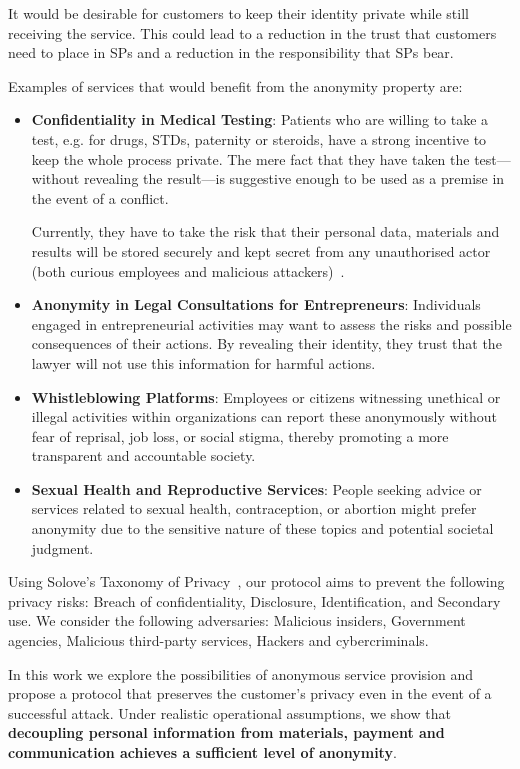 \documentclass[pdftex,twocolumn,epjc3]{svjour3}
\begin{document}
It would be desirable for customers to keep their identity private while still receiving the service. This could lead to a reduction in the trust that customers need to place in SPs and a reduction in the responsibility that SPs bear.

Examples of services that would benefit from the anonymity property are:
\begin{itemize}
    \item \textbf{Confidentiality in Medical Testing}: Patients who are willing to take a test, e.g. for drugs, STDs, paternity or steroids, have a strong incentive to keep the whole process private. The mere fact that they have taken the test—without revealing the result—is suggestive enough to be used as a premise in the event of a conflict.

    Currently, they have to take the risk that their personal data, materials and results will be stored securely and kept secret from any unauthorised actor (both curious employees and malicious attackers)~\cite{klitzmanExclusionGeneticInformation2010, blackPresymptomaticTestingConfidentiality2021}.


\item \textbf{Anonymity in Legal Consultations for Entrepreneurs}: Individuals engaged in entrepreneurial activities may want to assess the risks and possible consequences of their actions. By revealing their identity, they trust that the lawyer will not use this information for harmful actions.
\item \textbf{Whistleblowing Platforms}: Employees or citizens witnessing unethical or illegal activities within organizations can report these anonymously without fear of reprisal, job loss, or social stigma, thereby promoting a more transparent and accountable society.
\item \textbf{Sexual Health and Reproductive Services}: People seeking advice or services related to sexual health, contraception, or abortion might prefer anonymity due to the sensitive nature of these topics and potential societal judgment.
\end{itemize}

Using Solove's Taxonomy of Privacy~\cite{soloveTaxonomyPrivacy2006}, our protocol aims to prevent the following privacy risks: Breach of confidentiality, Disclosure, Identification, and Secondary use. We consider the following adversaries: Malicious insiders, Government agencies, Malicious third-party services, Hackers and cybercriminals.

In this work we explore the possibilities of anonymous service provision and propose a protocol that preserves the customer's privacy even in the event of a successful attack. Under realistic operational assumptions, we show that \textbf{decoupling personal information from materials, payment and communication achieves a sufficient level of anonymity}.
\end{document}
